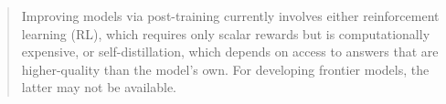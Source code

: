 \begin{abstract}



\iffalse
Improving models via post-training currently involves either reinforcement learning (RL), which requires only scalar rewards but is computationally expensive, or self-distillation, which depends on access to answers that are higher-quality than the model’s own. For developing  frontier models, the latter may not be available.



\end{abstract}
